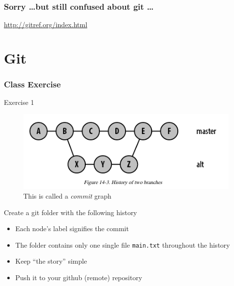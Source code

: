 \documentclass[hyperref={colorlinks=false},handout,10pt]{beamer}
\let\olditem\item
\renewcommand{\item}{\setlength{\itemsep}{0.5\baselineskip}\olditem}
\begin{document}
\begin{frame}
    \frametitle{Sorry \ldots but still confused about git \ldots}
    \begin{center}
        \href{http://gitref.org/index.html}{http://gitref.org/index.html}
    \end{center}
\end{frame}


\section{Git} 
\begin{frame}
    \frametitle{Class Exercise}
    \begin{block}{Exercise 1}
    \begin{figure}
        \caption{\Large This is called a \emph{commit} graph}
        \begin{center}
            \includegraphics[width=\textwidth]{images/gitmergehistory.png}
        \end{center}
    \end{figure}
    \end{block}
    \vskip0.5in
    
    \begin{block}{Create a git folder with the following history}
         \begin{itemize}
             \item Each node's label signifies the commit 
             \item The folder contains only one single file \texttt{main.txt}
                 throughout the history
             \item Keep ``the story'' simple
             \item Push it to your github (remote) repository
         \end{itemize}
    \end{block}


\end{frame}
\end{document}
